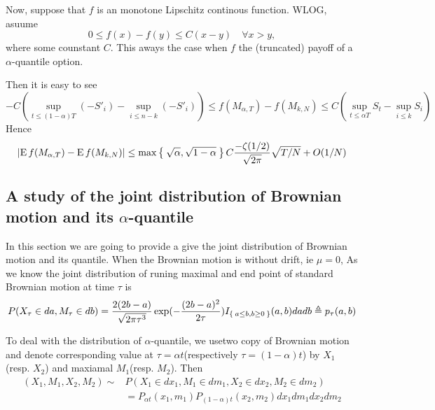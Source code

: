 \documentclass[12pt,oneside,titlepage]{book}
\def\abs#1{{\left|#1\right|}}
\def\E{{\mathrm{E}\,}}
\begin{document}
Now, suppose that $f$ is an monotone Lipschitz continous function.
WLOG, asuume
\begin{equation}\label{eq:lips}
0 \leq f(x)-f(y) \leq C (x-y) \quad \forall x>y,
\end{equation}
where some counstant $C$. This aways the case when $f$ the
(truncated) payoff of a $\alpha$-quantile option.

Then it is easy to see
\[
-C\left( \sup_{t\leq (1-\alpha)T} (-S'_i)-\sup_{i\leq n-k} (-S'_i)\right)
 \leq f(M_{\alpha,T}) - f(M_{k,N})
\leq  C \left(\sup_{t\leq \alpha{T}} S_t - \sup_{i\leq k} S_i\right)
\]
Hence
\[
\abs{\E f(M_{\alpha,T}) - \E f(M_{k,N})}
\leq \max\Set{\sqrt{\alpha}, \sqrt{1-\alpha}}
C\frac{-\zeta(1/2)}{\sqrt{2\pi}}\sqrt{T/N}  + O(1/N)
\]


\subsection{A study of the joint distribution of Brownian motion and its $\alpha$-quantile}
In this section we are going to provide a give the joint distribution of Brownian motion and its quantile. When the Brownian motion is without drift,
ie $\mu = 0 $,
As we know the joint distribution of runing maximal and end point of
standard Brownian motion at time $\tau$ is
\[
P(X_\tau\in da, M_\tau\in db) =
\frac{2(2b-a)}{\sqrt{2\pi \tau^3}} \exp(-\frac{(2b-a)^2}{2\tau})
I_{\Set{a\leq b, b\geq 0}} (a,b) da db \triangleq p_\tau(a,b)
\]

To deal with the distribution of $\alpha$-quantile, we usetwo copy of
Brownian motion and denote corresponding value at
$\tau=\alpha t$(respectively $\tau=(1-\alpha) t$) by $X_1$(resp. $X_2$) and
maxiamal $M_1$(resp. $M_2$).
Then
\[
\begin{split}
(X_1,M_1, X_2, M_2) \sim& P(X_1\in dx_1, M_1\in dm_1, X_2\in dx_2, M_2\in dm_2)\\
&= P_{\alpha t}(x_1, m_1) P_{(1-\alpha)t}(x_2,m_2) dx_1dm_1dx_2dm_2
\end{split}
\]
\end{document}
